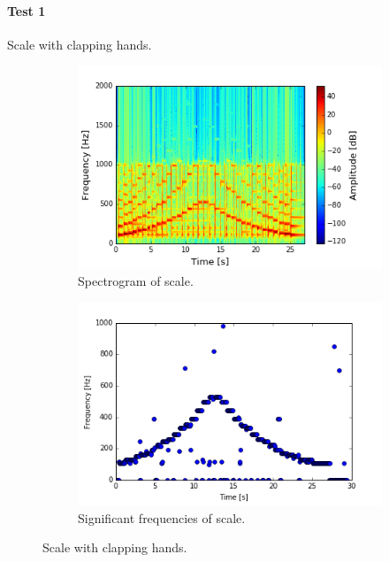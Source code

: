 \paragraph{Test 1} Scale with clapping hands.
\begin{figure}[H]
\centering
\begin{subfigure}{0.49\textwidth}
\centering
\includegraphics[width=\textwidth]{figures/validation/systemtest/final_spec1.png}
\caption{Spectrogram of scale.}
\label{fig:final_spec1}
\end{subfigure}
\begin{subfigure}{0.49\textwidth}
\centering
\includegraphics[width=\textwidth]{figures/validation/systemtest/final_peak1.png}
\caption{Significant frequencies of scale.}
\label{fig:final_peak1}
\end{subfigure}
\caption{Scale with clapping hands.}
\label{fig:final_1}
\end{figure} 

